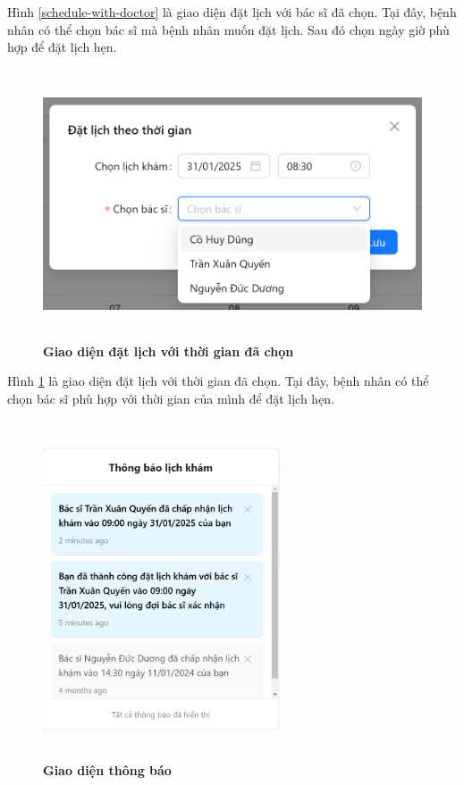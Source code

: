 Hình \ref{schedule-with-doctor} là giao diện đặt lịch với bác sĩ đã chọn. Tại đây, bệnh nhân có thể chọn bác sĩ mà bệnh nhân muốn đặt lịch. Sau đó chọn ngày giờ phù hợp để đặt lịch hẹn.

\begin{figure}[H]
	\centering
	\includegraphics[width=15cm,height=8cm]{Images/patient_ui/schedule-with-time.png}
	\caption[Giao diện đặt lịch với thời gian đã chọn]{\bfseries \fontsize{12pt}{0pt}\selectfont Giao diện đặt lịch với thời gian đã chọn}
	\label{schedule-with-time}
\end{figure}

Hình \ref{schedule-with-time} là giao diện đặt lịch với thời gian đã chọn. Tại đây, bệnh nhân có thể chọn bác sĩ phù hợp với thời gian của mình để đặt lịch hẹn.

\begin{figure}[H]
	\centering
	\includegraphics[width=7cm,height=10cm]{Images/patient_ui/noti.png}
	\caption[Giao diện thông báo]{\bfseries \fontsize{12pt}{0pt}\selectfont Giao diện thông báo}
	\label{noti-patient}
\end{figure}

